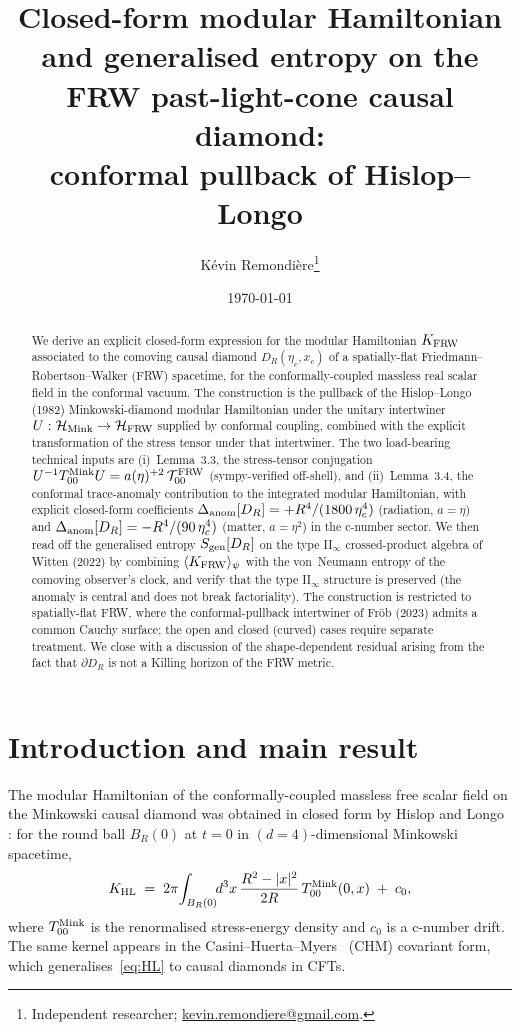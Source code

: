 \documentclass[11pt,a4paper]{article}
\title{Closed-form modular Hamiltonian and generalised entropy on the\\
       FRW past-light-cone causal diamond:\\
       conformal pullback of Hislop--Longo}
\author{Kévin Remondière\thanks{Independent researcher; \href{mailto:kevin.remondiere@gmail.com}{kevin.remondiere@gmail.com}.}}
\date{\today}
\theoremstyle{remark}
\newcommand{\FRW}{{\rm FRW}}
\newcommand{\HL}{{\rm HL}}
\newcommand{\Mink}{{\rm Mink}}
\newcommand{\Tt}{\mathcal{T}}
\begin{document}
\maketitle

\begin{abstract}
We derive an explicit closed-form expression for the modular Hamiltonian
$K_{\FRW}$ associated to the comoving causal diamond
$D_R(\eta_c, x_c)$ of a spatially-flat Friedmann--Robertson--Walker (FRW)
spacetime, for the conformally-coupled massless real scalar field in the
conformal vacuum. The construction is the pullback of the Hislop--Longo
(1982) Minkowski-diamond modular Hamiltonian under the unitary intertwiner
$U:\mathcal H_{\Mink}\to\mathcal H_{\FRW}$ supplied by conformal coupling,
combined with the explicit transformation of the stress tensor under that
intertwiner. The two load-bearing technical inputs are
(i)~Lemma~3.3, the stress-tensor conjugation
$U^{-1}T_{00}^{\Mink}U = a(\eta)^{+2}\,\Tt_{00}^{\FRW}$ (sympy-verified
off-shell), and (ii)~Lemma~3.4, the conformal trace-anomaly contribution
to the integrated modular Hamiltonian, with explicit closed-form
coefficients $\Delta_{\rm anom}[D_R] = +R^{4}/(1800\,\eta_c^{4})$
(radiation, $a=\eta$) and $\Delta_{\rm anom}[D_R] = -R^{4}/(90\,\eta_c^{4})$
(matter, $a=\eta^{2}$) in the c-number sector. We then read off the generalised
entropy $S_{\rm gen}[D_R]$ on the type II$_\infty$ crossed-product algebra
of Witten (2022) by combining $\langle K_{\FRW}\rangle_\psi$ with the
von~Neumann entropy of the comoving observer's clock, and verify that the
type II$_\infty$ structure is preserved (the anomaly is central and does
not break factoriality). The construction is restricted to spatially-flat
FRW, where the conformal-pullback intertwiner of Fr\"ob (2023) admits a
common Cauchy surface; the open and closed (curved) cases require separate
treatment. We close with a discussion of the shape-dependent residual
arising from the fact that $\partial D_R$ is not a Killing horizon of the
FRW metric.
\end{abstract}

\section{Introduction and main result}
\label{sec:intro}

The modular Hamiltonian of the conformally-coupled massless free scalar
field on the Minkowski causal diamond was obtained in closed form by
Hislop and Longo \cite{HislopLongo1982}: for the round ball $B_R(0)$
at $t=0$ in $(d{=}4)$-dimensional Minkowski spacetime,
\begin{equation}
  K_{\HL}\;=\;2\pi\!\int_{B_R(0)}\!\!d^{3}x\,
    \frac{R^2-|x|^2}{2R}\,T_{00}^{\Mink}(0,x)\;+\;c_0,
\label{eq:HL}
\end{equation}
where $T_{00}^{\Mink}$ is the renormalised stress-energy density and
$c_0$ is a c-number drift. The same kernel appears in the
Casini--Huerta--Myers~\cite{CasiniHuertaMyers2011} (CHM) covariant form,
which generalises~\eqref{eq:HL} to causal diamonds in CFTs.
\end{document}
